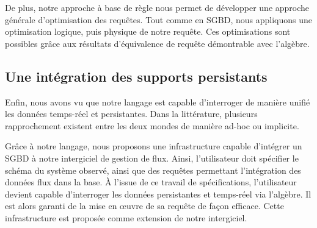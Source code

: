De plus, notre approche à base de règle nous permet de développer une approche générale d'optimisation des requêtes. Tout comme en SGBD, nous appliquons une optimisation logique, puis physique de notre requête. Ces optimisations sont possibles grâce aux résultats d'équivalence de requête démontrable avec l'algèbre.

\subsection{Une intégration des supports persistants}
Enfin, nous avons vu que notre langage est capable d'interroger de manière unifié les données temps-réel et persistantes. Dans la littérature, plusieurs rapprochement existent entre les deux mondes de manière ad-hoc ou implicite.

Grâce à notre langage, nous proposons une infrastructure capable d'intégrer un SGBD à notre intergiciel de gestion de flux. Ainsi, l'utilisateur doit spécifier le schéma du système observé, ainsi que des requêtes permettant l'intégration des données flux dans la base. À l'issue de ce travail de spécifications, l'utilisateur devient capable d'interroger les données persistantes et temps-réel via l'algèbre. Il est alors garanti de la mise en œuvre de sa requête de façon efficace. Cette infrastructure est proposée comme extension de notre intergiciel.
